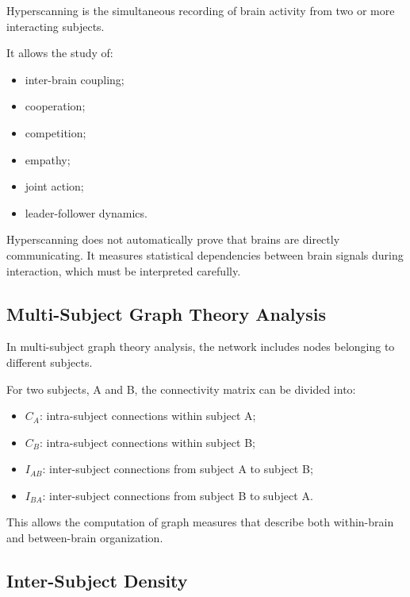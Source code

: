 Hyperscanning is the simultaneous recording of brain activity from two or more interacting subjects.

It allows the study of:

\begin{itemize}[noitemsep]
    \item inter-brain coupling;
    \item cooperation;
    \item competition;
    \item empathy;
    \item joint action;
    \item leader-follower dynamics.
\end{itemize}

\begin{authornote}
Hyperscanning does not automatically prove that brains are directly communicating. It measures statistical dependencies between brain signals during interaction, which must be interpreted carefully.
\end{authornote}

\subsection{Multi-Subject Graph Theory Analysis}

In multi-subject graph theory analysis, the network includes nodes belonging to different subjects.

For two subjects, A and B, the connectivity matrix can be divided into:

\begin{itemize}[noitemsep]
    \item $C_A$: intra-subject connections within subject A;
    \item $C_B$: intra-subject connections within subject B;
    \item $I_{AB}$: inter-subject connections from subject A to subject B;
    \item $I_{BA}$: inter-subject connections from subject B to subject A.
\end{itemize}

This allows the computation of graph measures that describe both within-brain and between-brain organization.

\subsection{Inter-Subject Density}


